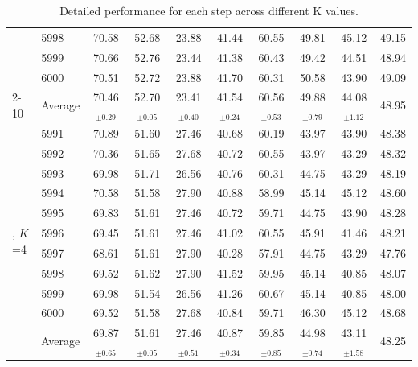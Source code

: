 \begin{table}[t]
{\begin{tabular}{llcccccccc}
& 5998 & 70.58 & 52.68 & 23.88 & 41.44 & 60.55 & 49.81 & 45.12 & 49.15 \\
& 5999 & 70.66 & 52.76 & 23.44 & 41.38 & 60.43 & 49.42 & 44.51 & 48.94 \\
& 6000 & 70.51 & 52.72 & 23.88 & 41.70 & 60.31 & 50.58 & 43.90 & 49.09 \\
\cmidrule{2-10}
& Average & 70.46$_{\pm 0.29}$ & 52.70$_{\pm 0.05}$ & 23.41$_{\pm 0.40}$ & 41.54$_{\pm 0.24}$ & 60.56$_{\pm 0.53}$ & 49.88$_{\pm 0.79}$ & 44.08$_{\pm 1.12}$ & 48.95 \\
\midrule
\multirow{11}{*}{\name{}, $K$=4} 
& 5991 & 70.89 & 51.60 & 27.46 & 40.68 & 60.19 & 43.97 & 43.90 & 48.38 \\
& 5992 & 70.36 & 51.65 & 27.68 & 40.72 & 60.55 & 43.97 & 43.29 & 48.32 \\
& 5993 & 69.98 & 51.71 & 26.56 & 40.76 & 60.31 & 44.75 & 43.29 & 48.19 \\
& 5994 & 70.58 & 51.58 & 27.90 & 40.88 & 58.99 & 45.14 & 45.12 & 48.60 \\
& 5995 & 69.83 & 51.61 & 27.46 & 40.72 & 59.71 & 44.75 & 43.90 & 48.28 \\
& 5996 & 69.45 & 51.61 & 27.46 & 41.02 & 60.55 & 45.91 & 41.46 & 48.21 \\
& 5997 & 68.61 & 51.61 & 27.90 & 40.28 & 57.91 & 44.75 & 43.29 & 47.76 \\
& 5998 & 69.52 & 51.62 & 27.90 & 41.52 & 59.95 & 45.14 & 40.85 & 48.07 \\
& 5999 & 69.98 & 51.54 & 26.56 & 41.26 & 60.67 & 45.14 & 40.85 & 48.00 \\
& 6000 & 69.52 & 51.58 & 27.68 & 40.84 & 59.71 & 46.30 & 45.12 & 48.68 \\
\cmidrule{2-10}
& Average & 69.87$_{\pm 0.65}$ & 51.61$_{\pm 0.05}$ & 27.46$_{\pm 0.51}$ & 40.87$_{\pm 0.34}$ & 59.85$_{\pm 0.85}$ & 44.98$_{\pm 0.74}$ & 43.11$_{\pm 1.58}$ & 48.25 \\
\bottomrule
\end{tabular}
}
\caption{Detailed performance for each step across different K values.}
\label{tab:detailed_results_appendix}
\end{table}